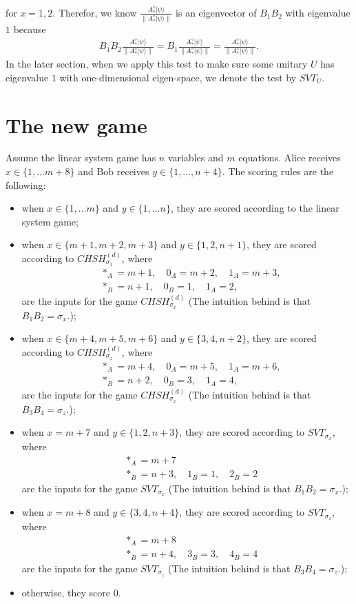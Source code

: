\documentclass[11pt,letterpaper]{article}
\newcommand{\ket}[1]{|#1\rangle}
\newcommand{\1}{\mathbb{1}}
\newcommand{\CHSH}{CHSH^{(d)}}
\newcommand{\SVT}{SVT}
\theoremstyle{definition}
\begin{document}
for $x = 1,2$.
Therefor, we know $ \frac{A_\ast^\diamond \ket{\psi}}{\| A_\ast^\diamond \ket{\psi}\|} $ is an eigenvector of $B_1B_2$ with eigenvalue $1$ because
\begin{align}
	B_1B_2 \frac{A_\ast^\diamond \ket{\psi}}{\| A_\ast^\diamond \ket{\psi}\|} = B_1 \frac{A_\ast^\diamond \ket{\psi}}{\| A_\ast^\diamond \ket{\psi}\|} =  \frac{A_\ast^\diamond \ket{\psi}}{\| A_\ast^\diamond \ket{\psi}\|}.
\end{align}
In the later section, when we apply this test to make sure some unitary $U$ has eigenvalue $1$ with one-dimensional eigen-space, we denote the test by $\SVT_U$.
\section{The new game} 
\label{sec:main}
Assume the linear system game has $n$ variables and $m$ equations.
Alice receives $x \in \{1,\dots m+8 \}$ and Bob receives
$y \in \{1,\dots,n+4\}$. The scoring rules are the following:
\begin{itemize}
	\item when $x \in \{1,\dots m\}$ and $y \in \{1, \dots n\}$, they are scored according to the 
	linear system game;
	\item when $x \in \{m+1, m+2, m+3\}$ and $y \in \{1, 2, n+1\}$, they are scored according to $\CHSH_{\sigma_x}$,
	where 
	\begin{align}
		&\ast_A = m+1, \quad 0_A = m+2,\quad 1_A = m+3,\\
		&\ast_B = n+1,\quad 0_B = 1, \quad 1_A = 2,
	\end{align}
	are the inputs for the game $\CHSH_{\sigma_x}$
	(The intuition behind is that $B_1B_2 = \sigma_x$.);
	\item when $x \in \{m+4, m+5, m+6\}$ and $y \in \{3, 4, n+2\}$, they are scored according to $\CHSH_{\sigma_z}$,
	where 
	\begin{align}
		&\ast_A = m+4,\quad 0_A = m+5,\quad 1_A = m+6,\\
		&\ast_B = n+2, \quad 0_B = 3, \quad 1_A = 4,
	\end{align}
	are the inputs for the game $\CHSH_{\sigma_z}$
	(The intuition behind is that $B_3B_4 = \sigma_z$.);
	\item when $x = m+7$ and  $y \in \{1,2,n+3\}$, they are scored according to $\SVT_{\sigma_x}$, where
	\begin{align}
		& \ast_A = m+7 \\
		& \ast_B = n+3, \quad 1_B = 1,\quad 2_B = 2
	\end{align}
	are the inputs for the game $\SVT_{\sigma_x}$
	(The intuition behind is that $B_1B_2 = \sigma_x$.);
	\item when $x = m+8$ and $y \in \{3,4,n+4\}$, they are scored according to $\SVT_{\sigma_z}$, where
	\begin{align}
		& \ast_A = m+8 \\
		& \ast_B = n+4, \quad 3_B = 3,\quad 4_B = 4
	\end{align}
	are the inputs for the game $\SVT_{\sigma_z}$
	(The intuition behind is that $B_3B_4 = \sigma_z$.);
	\item otherwise, they score $0$.
\end{itemize}
\end{document}
